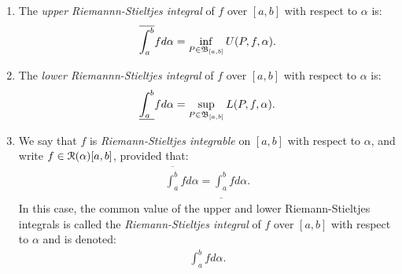     \begin{definition}
        \phantom{a}
            \begin{enumerate}[label = (\arabic*),itemsep=1pt,topsep=3pt]
                \item The \textit{upper Riemannn-Stieltjes integral} of $f$ over $[a,b]$ with respect to $\alpha$ is:
                    \begin{equation*}
                    \begin{split}
                        \overline{\int_{a}^{b}}f d\alpha =\inf_{P \in \mathfrak{B}_{[a,b]}}U(P,f,\alpha).
                    \end{split}
                    \end{equation*}
                \item The \textit{lower Riemannn-Stieltjes integral} of $f$ over $[a,b]$ with respect to $\alpha$ is:
                \begin{equation*}
                \begin{split}
                    \underline{\int_{a}^{b}}f d\alpha =\sup_{P \in \mathfrak{B}_{[a,b]}}L(P,f,\alpha).
                    \end{split}
                    \end{equation*}

                \item We say that $f$ is \textit{Riemann-Stieltjes integrable} on $[a,b]$ with respect to $\alpha$, and write $f \in \mathcal{R}(\alpha)[a,b]$, provided that:
                    \begin{equation*}
                    \begin{split}
                        \overline{\int_{a}^{b}}f d\alpha = \underline{\int_{a}^{b}}f d\alpha .
                    \end{split}
                    \end{equation*}
                In this case, the common value of the upper and lower Riemann-Stieltjes integrals is called the \textit{Riemann-Stieltjes integral} of $f$ over $[a,b]$ with respect to $\alpha$ and is denoted:
                    \begin{equation*}
                    \begin{split}
                        \int_a^b f d\alpha.
                    \end{split}
                    \end{equation*}


\end{enumerate}
\end{definition}

